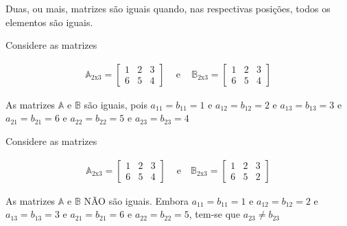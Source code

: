 Duas, ou mais, matrizes são iguais quando, nas respectivas posições,
todos os elementos são iguais.
\begin{example}
	Considere as matrizes
	
\begin{ceqn}
	\begin{align*}
		\mathbb{A}_{2\mathrm{x}3}=\begin{bmatrix}1 & 2 & 3\\
	6 & 5 & 4
	\end{bmatrix}\,\,\,\,\,\,\,\mathrm{e\,\,\,\,\,\,\,\mathbb{B}_{2\mathrm{x}3}=\begin{bmatrix}1 & 2 & 3\\
		6 & 5 & 4
		\end{bmatrix}}
	\end{align*}
\end{ceqn}
	
	As matrizes $\mathbb{A}$ e $\mathbb{B}$ são iguais, pois $a_{11}=b_{11}=1$
	e $a_{12}=b_{12}=2$ e $a_{13}=b_{13}=3$ e $a_{21}=b_{21}=6$ e $a_{22}=b_{22}=5$
	e $a_{23}=b_{23}=4$
\end{example}
%
\begin{example}
	Considere as matrizes
	
\begin{ceqn}
	\begin{align*}
		\mathbb{A}_{2\mathrm{x}3}=\begin{bmatrix}1 & 2 & 3\\
	6 & 5 & 4
	\end{bmatrix}\,\,\,\,\,\,\,\mathrm{e\,\,\,\,\,\,\mathbb{B}_{2\mathrm{x}3}=\begin{bmatrix}1 & 2 & 3\\
		6 & 5 & 2
		\end{bmatrix}}
	\end{align*}
\end{ceqn}
	
	As matrizes $\mathbb{A}$ e $\mathbb{B}$ NÃO são iguais. Embora $a_{11}=b_{11}=1$
	e $a_{12}=b_{12}=2$ e $a_{13}=b_{13}=3$ e $a_{21}=b_{21}=6$ e $a_{22}=b_{22}=5$,
	tem-se que $a_{23}\ne b_{23}$
\end{example}
%

